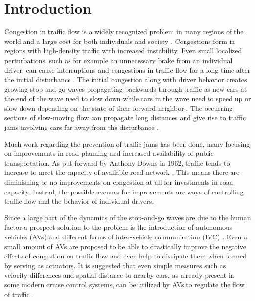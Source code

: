 \documentclass[11pt,a4paper,twocolumn]{article}
\begin{document}
\section{Introduction}
Congestion in traffic flow is a widely recognized problem in many regions of the world and a large cost for both individuals and society \cite{inrix}. Congestions form in regions with high-density traffic with increased instability. Even small localized perturbations, such as for example an unnecessary brake from an individual driver, can cause interruptions and congestions in traffic flow for a long time after the initial disturbance \cite{kerner97flow, bando1995dynamical}. The initial congestion along with driver behavior creates growing stop-and-go waves propagating backwards through traffic as new cars at the end of the wave need to slow down while cars in the wave need to speed up or slow down depending on the state of their forward neighbor  \cite{stern17autonomous, kerner96trafficjam}. The occurring sections of slow-moving flow can propagate long distances and give rise to traffic jams involving cars far away from the disturbance \cite{kerner96trafficjam}.

Much work regarding the prevention of traffic jams has been done, many focusing on improvements in road planning and increased availability of public transportation. As put forward by Anthony Downs in 1962, traffic tends to increase to meet the capacity of available road network \cite{downs2000stuck, downs2005still, downs1962law}. This means there are diminishing or no improvements on congestion at all for investments in road capacity. Instead, the possible avenues for improvements are ways of controlling traffic flow and the behavior of individual drivers.

Since a large part of the dynamics of the stop-and-go waves are due to the human factor a prospect solution to the problem is the introduction of autonomous vehicles (AVs) and different forms of inter-vehicle communication (IVC) \cite{stern17autonomous, darbha1999cruisecontrol, bauza2013vehicle2vehicle, fagnant2015autonomous}. Even a small amount of AVs are proposed to be able to drastically improve the negative effects of congestion on traffic flow and even help to dissipate them when formed by serving as actuators. It is suggested that even simple measures such as velocity differences and spatial distance to nearby cars, as already present in some modern cruise control systems, can be utilized by AVs to regulate the flow of traffic \cite{stern17autonomous}.
\end{document}

